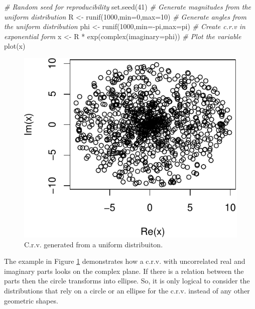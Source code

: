\documentclass[
]{book}
\newenvironment{Shaded}{\begin{snugshade}}{\end{snugshade}}
\newcommand{\AttributeTok}[1]{\textcolor[rgb]{0.77,0.63,0.00}{#1}}
\newcommand{\CommentTok}[1]{\textcolor[rgb]{0.56,0.35,0.01}{\textit{#1}}}
\newcommand{\DecValTok}[1]{\textcolor[rgb]{0.00,0.00,0.81}{#1}}
\newcommand{\FunctionTok}[1]{\textcolor[rgb]{0.00,0.00,0.00}{#1}}
\newcommand{\NormalTok}[1]{#1}
\newcommand{\OtherTok}[1]{\textcolor[rgb]{0.56,0.35,0.01}{#1}}
\newcommand{\SpecialCharTok}[1]{\textcolor[rgb]{0.00,0.00,0.00}{#1}}
\begin{document}
\begin{Shaded}
\begin{Highlighting}[]
\CommentTok{\# Random seed for reproducibility}
\FunctionTok{set.seed}\NormalTok{(}\DecValTok{41}\NormalTok{)}
\CommentTok{\# Generate magnitudes from the uniform distribution}
\NormalTok{R }\OtherTok{\textless{}{-}} \FunctionTok{runif}\NormalTok{(}\DecValTok{1000}\NormalTok{,}\AttributeTok{min=}\DecValTok{0}\NormalTok{,}\AttributeTok{max=}\DecValTok{10}\NormalTok{)}
\CommentTok{\# Generate angles from the uniform distribution}
\NormalTok{phi }\OtherTok{\textless{}{-}} \FunctionTok{runif}\NormalTok{(}\DecValTok{1000}\NormalTok{,}\AttributeTok{min=}\SpecialCharTok{{-}}\NormalTok{pi,}\AttributeTok{max=}\NormalTok{pi)}
\CommentTok{\# Create c.r.v in exponential form}
\NormalTok{x }\OtherTok{\textless{}{-}}\NormalTok{ R }\SpecialCharTok{*} \FunctionTok{exp}\NormalTok{(}\FunctionTok{complex}\NormalTok{(}\AttributeTok{imaginary=}\NormalTok{phi))}
\CommentTok{\# Plot the variable}
\FunctionTok{plot}\NormalTok{(x)}
\end{Highlighting}
\end{Shaded}

\begin{figure}
\centering
\includegraphics{Svetunkov---Svetunkov---Complex-Valued-Econometrics_files/figure-latex/crvGeneratedCircle-1.pdf}
\caption{\label{fig:crvGeneratedCircle}C.r.v. generated from a uniform distribuiton.}
\end{figure}

The example in Figure \ref{fig:crvGeneratedCircle} demonstrates how a c.r.v. with uncorrelated real and imaginary parts looks on the complex plane. If there is a relation between the parts then the circle transforms into ellipse. So, it is only logical to consider the distributions that rely on a circle or an ellipse for the c.r.v. instead of any other geometric shapes.
\end{document}
